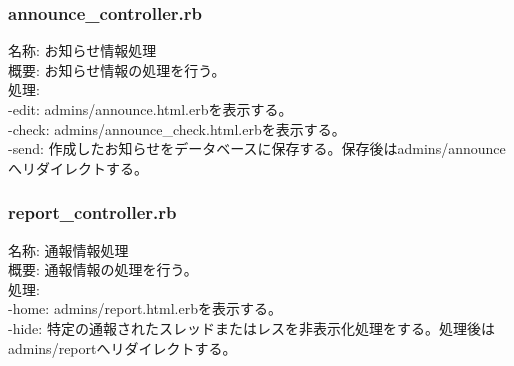 \documentclass[a4j]{jarticle}
\begin{document}
\subsubsection{announce\_controller.rb}
\noindent 名称: お知らせ情報処理 \\
概要: お知らせ情報の処理を行う。 \\
処理:  \\
-edit: admins/announce.html.erbを表示する。\\
-check: admins/announce\_check.html.erbを表示する。\\
-send: 作成したお知らせをデータベースに保存する。保存後はadmins/announceへリダイレクトする。

\subsubsection{report\_controller.rb}
\noindent 名称: 通報情報処理 \\
概要: 通報情報の処理を行う。 \\
処理:  \\
-home: admins/report.html.erbを表示する。\\
-hide: 特定の通報されたスレッドまたはレスを非表示化処理をする。処理後はadmins/reportへリダイレクトする。
\end{document}

